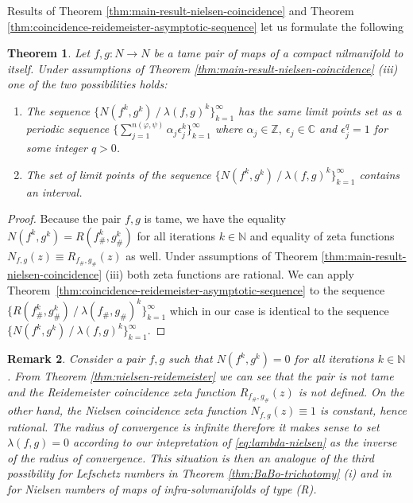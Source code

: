 \documentclass[12pt, a4paper]{amsart}
\def\C{{\mathbb C}}
\def\Z{{\mathbb Z}}
\newtheorem{theorem}{Theorem}
\newtheorem{remark}[theorem]{Remark}
\def\N{{\mathbb N}}
\begin{document}
Results of Theorem \ref{thm:main-result-nielsen-coincidence}
and Theorem \ref{thm:coincidence-reidemeister-asymptotic-sequence} let us formulate the following
\begin{theorem}
  Let $f,g: N \to N$ be a tame pair of maps of a compact nilmanifold to itself.
  Under assumptions of {\rm Theorem \ref{thm:main-result-nielsen-coincidence}
  (iii)} one of the two possibilities holds:
  \begin{enumerate}
    \item[(i)] The sequence $\{ N(f^k,g^k) \ / \ \lambda(f, g)^k \}_{k=1}^\infty$ has the same
      limit points set as a periodic sequence $\{ \sum_{j=1}^{n(\varphi, \psi)} \alpha_j \epsilon_j^k \}_{k=1}^\infty$
      where $\alpha_j \in \Z, \ \epsilon_j \in \C$ and $\epsilon_j^q = 1$ for some integer $q>0$.
    \item[(ii)] The set of limit points of the sequence $\{ N(f^k, g^k) \ / \ \lambda(f, g)^k \}_{k=1}^\infty$
      contains an interval.
  \end{enumerate}
\end{theorem}
\begin{proof}
  Because the pair $f,g$ is tame, we have the equality $N(f^k,g^k) = R(f_\#^k,g_\#^k)$ for all iterations $k \in \N$
  and equality of zeta functions $N_{f,g}(z) \equiv R_{f_\#,g_\#}(z)$ as well.
  Under assumptions of {\rm Theorem \ref{thm:main-result-nielsen-coincidence}
  (iii)} both zeta functions are rational.
  We can apply Theorem~\ref{thm:coincidence-reidemeister-asymptotic-sequence}
  to the sequence $\{ R(f_\#^k,g_\#^k) \ / \ \lambda(f_\#,g_\#)^k\}_{k=1}^\infty$
  which in our case is identical to the sequence $\{ N(f^k,g^k) \ / \ \lambda(f, g)^k \}_{k=1}^\infty$.
\end{proof}

\begin{remark}
  Consider a pair $f,g$ such that $N(f^k,g^k)=0$ for all iterations $k \in \N$.
  From {\rm Theorem \ref{thm:nielsen-reidemeister}} we can see that the pair is not tame
  and the Reidemeister coincidence zeta function $R_{f_\#,g_\#}(z)$ is not defined.
  On the other hand, the Nielsen coincidence zeta function $N_{f,g}(z) \equiv 1$ is constant, hence rational.
  The radius of convergence is infinite therefore it makes sense to set $\lambda(f,g)=0$
  according to our intepretation of \eqref{eq:lambda-nielsen} as the inverse of the radius of convergence.
  This situation is then an analogue of the third possibility for Lefschetz numbers
  in {\rm Theorem \ref{thm:BaBo-trichotomy} (i)} and in {\rm \cite[Theorem 4.1 (1)]{FelsLee}}
  for Nielsen numbers of maps of infra-solvmanifolds of type {\rm (R)}.
\end{remark}
\end{document}
